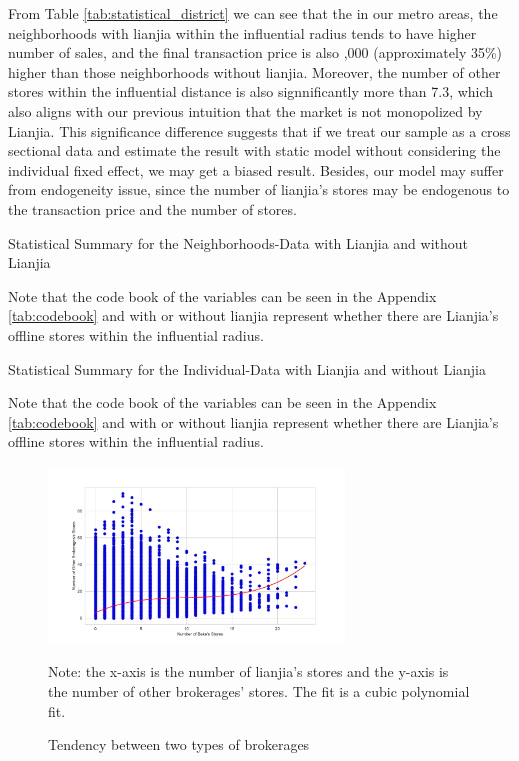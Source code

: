 \documentclass[11pt]{article}
\begin{document}
From Table \ref{tab:statistical_district} we can see that the in our metro areas, the neighborhoods with lianjia within the influential radius tends to have higher number of sales, and the final transaction price is also ,000 (approximately 35\%) higher than those neighborhoods without lianjia. Moreover, the number of other stores within the influential distance is also signnificantly more than 7.3, which also aligns with our previous intuition that the market is not monopolized by Lianjia. This significance difference suggests that if we treat our sample as a cross sectional data and estimate the result with static model without considering the individual fixed effect, we may get a biased result. Besides, our model may suffer from endogeneity issue, since the number of lianjia's stores may be endogenous to the transaction price and the number of stores. 

\begin{table}[htb!]
    \centering
    \begin{tiny}
    \caption{Statistical Summary for the Neighborhoods-Data with Lianjia and without Lianjia}
    
    \label{tab:statistical_district}

    Note that the code book of the variables can be seen in the Appendix \ref{tab:codebook} and with or without lianjia represent whether there are Lianjia's offline stores within the influential radius.
    \end{tiny}
\end{table}

\begin{table}[htb!]
  \centering
  \begin{tiny}
  \caption{Statistical Summary for the Individual-Data with Lianjia and without Lianjia}
  
  \label{tab:statistical_individual}

  Note that the code book of the variables can be seen in the Appendix \ref{tab:codebook} and with or without lianjia represent whether there are Lianjia's offline stores within the influential radius.
  \end{tiny}  
\end{table}

\begin{figure}
    \centering
    \includegraphics[width=0.7\textwidth]{../figures/scatter_plot_with_two_brokerages.pdf}
    \caption{Tendency between two types of brokerages}
    \label{fig:same_distribution}
    Note: the x-axis is the number of lianjia's stores and the y-axis is the number of other brokerages' stores. The fit is a cubic polynomial fit.
\end{figure}
\end{document}

